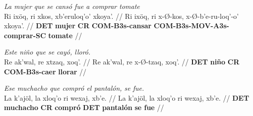 \documentclass{article}%
\begin{document}
%
\par\medskip%
\ex
\textit{La mujer que se cansó fue a comprar tomate} \\
\begingl
\gla Ri ixöq, ri xkos, xb'eruloq'o' xkoya'. //
\glb Ri ixöq, ri x-Ø-kos, x-Ø-b'e-ru-loq'-o' xkoya'. //
\glc \textbf{DET} \textbf{mujer} \textbf{CR} \textbf{COM-}\textbf{B3s-}\textbf{cansar} \textbf{COM-}\textbf{B3s-}\textbf{MOV-}\textbf{A3s-}\textbf{comprar-}\textbf{SC} \textbf{tomate} //
\endgl
\xe
%
\medskip%
\par\medskip%
\ex
\textit{Este niño que se cayó, lloró.} \\
\begingl
\gla Re ak'wal, re xtzaq, xoq'. //
\glb Re ak'wal, re x-Ø-tzaq, xoq'. //
\glc \textbf{DET} \textbf{niño} \textbf{CR} \textbf{COM-}\textbf{B3s-}\textbf{caer} \textbf{llorar} //
\endgl
\xe
%
\medskip%
\par\medskip%
\ex
\textit{Ese muchacho que compró el pantalón, se fue.} \\
\begingl
\gla La k'ajöl, la xloq'o ri wexaj, xb'e. //
\glb La k'ajöl, la xloq'o ri wexaj, xb'e. //
\glc \textbf{DET} \textbf{muchacho} \textbf{CR} \textbf{compró} \textbf{DET} \textbf{pantalón} \textbf{se fue} //
\endgl
\xe
%
\medskip

%
\end{document}
